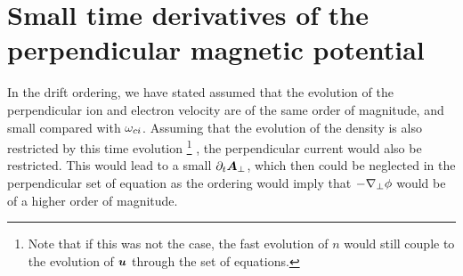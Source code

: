 \section{Small time derivatives of the perpendicular magnetic potential}
%
In the drift ordering, we have stated assumed that the evolution of the perpendicular ion and electron velocity are of the same order of magnitude, and small compared with $\omega_{ci}$.
Assuming that the evolution of the density is also restricted by this time evolution%
%
\footnote{Note that if this was not the case, the fast evolution of $n$ would still couple to the evolution of $\boldsymbol{u}$ through the set of equations.}%
%
, the perpendicular current would also be restricted.
This would lead to a small $\partial_t \boldsymbol{A}_\perp$, which then could be neglected in the perpendicular set of equation as the ordering would imply that $-\nabla_\perp\phi$ would be of a higher order of magnitude.

